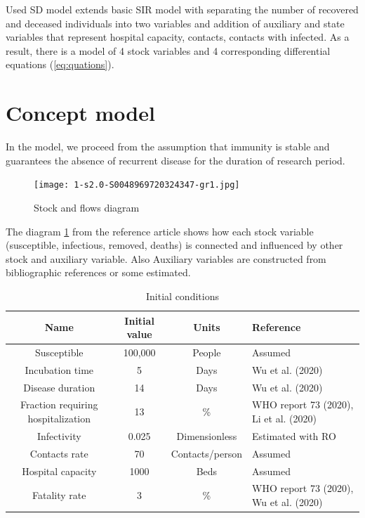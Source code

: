 \documentclass[12pt,a4paper,english]{article}
\begin{document}
    Used SD model extends basic SIR model with separating the number of recovered and deceased individuals into two variables and addition of auxiliary and state variables that represent hospital capacity, contacts, contacts with infected. 
    As a result, there is a model of 4 stock variables and 4 corresponding differential equations (\ref{eq:quations}).

    \newpage
    \section{Concept model} \label{conc_model}
    In the model, we proceed from the assumption that immunity is stable and guarantees the absence of recurrent disease for the duration of research period. 
    
    \begin{center}
        \begin{figure}[ht!]
            \texttt{[image: 1-s2.0-S0048969720324347-gr1.jpg]}
            \caption{Stock and flows diagram}
            \label{fig:graph}
        \end{figure}
    \end{center}
    
    The diagram \ref{fig:graph}  from the reference article shows how each stock variable (susceptible, infectious, removed, deaths) is connected and influenced by other stock and auxiliary variable.
    Also 
    Auxiliary variables are constructed from bibliographic references or some estimated.
    
    \begin{table}[h!]
        \centering
        \begin{tabularx}{\textwidth}{|c|c|c|X|}
            \hline
            Name & Initial value & Units & Reference \\
            \hline
            Susceptible	                        & 100,000 &	People & Assumed\\
            Incubation time	                    & 5	 &  Days & Wu et al. (2020)\\
            Disease duration                    & 14	&  Days & Wu et al. (2020)\\
            Fraction requiring hospitalization	& 13  & \% & WHO report 73 (2020), Li et al. (2020) \\
            Infectivity	                        & 0.025 & Dimensionless & Estimated with RO \\
            Contacts rate	                    & 70   & Contacts/person & Assumed \\
            Hospital capacity	                & 1000 & Beds & Assumed \\
            Fatality rate	                    & 3	   & \% & WHO report 73 (2020), Wu et al. (2020) \\
            \hline
        \end{tabularx}
        \caption{Initial conditions \cite{math_article}}
        \label{tab:init_vars}
    \end{table}
    
\end{document}
